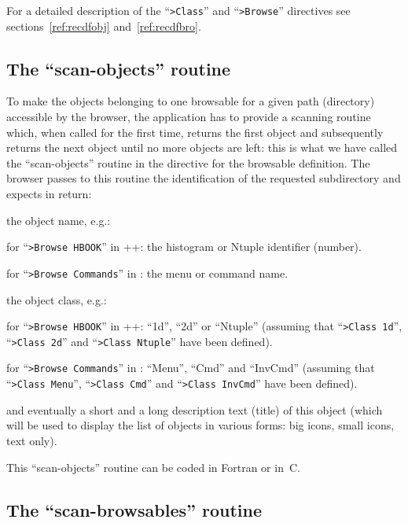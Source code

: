 For a detailed description of the ``{\tt >Class}'' and
``{\tt >Browse}'' \CDF{} directives see sections~\ref{ref:recdfobj} 
and~\ref{ref:recdfbro}.

\subsection{The ``scan-objects'' routine}

To make the objects belonging to one browsable for a given path (directory)
accessible by the browser, the application has to provide a scanning routine 
which, when called for the first time, returns the first object and
subsequently returns the next object until no more objects are left: this
is what we have called the ``scan-objects'' routine in the \CDF{} directive 
for the browsable definition. The browser passes to this routine the 
identification of the requested subdirectory and expects in return:
\begin{UL}
\item
the object name, e.g.: 
\begin{UL}
\item
for ``{\tt >Browse HBOOK}'' in \PAW++{}: the histogram or Ntuple identifier 
(number).
\item
for ``{\tt >Browse Commands}'' in \KUIPMotif{}: the menu or command name.
\end{UL}
\item
the object class, e.g.: 
\begin{UL}
\item
for ``{\tt >Browse HBOOK}'' in \PAW++{}: ``1d'', ``2d'' or ``Ntuple'' 
(assuming that ``{\tt >Class 1d}'', ``{\tt >Class 2d}'' and 
``{\tt >Class Ntuple}'' have been defined).
\item
for ``{\tt >Browse Commands}'' in \KUIPMotif{}: ``Menu'', ``Cmd'' and ``InvCmd''
(assuming that ``{\tt >Class Menu}'', ``{\tt >Class Cmd}'' and 
``{\tt >Class InvCmd}'' have been defined).
\end{UL}
\item
and eventually a short and a long description text (title) of this object 
(which will be used to display the list of objects in various forms: big icons, 
small icons, text only).
\end{UL}
This ``scan-objects'' routine can be coded in Fortran or in~C. 

\subsection{The ``scan-browsables'' routine}

